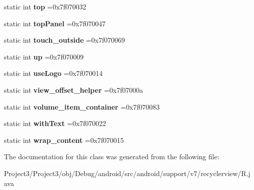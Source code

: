 \begin{DoxyCompactItemize}
static int {\bfseries top} =0x7f070032
\item 
\mbox{\label{classandroid_1_1support_1_1v7_1_1recyclerview_1_1R_1_1id_a37dfdd9a87356f548857577010e848c9}} 
static int {\bfseries top\+Panel} =0x7f070047
\item 
\mbox{\label{classandroid_1_1support_1_1v7_1_1recyclerview_1_1R_1_1id_affda487f57170dbda7543befe17f31a2}} 
static int {\bfseries touch\+\_\+outside} =0x7f070069
\item 
\mbox{\label{classandroid_1_1support_1_1v7_1_1recyclerview_1_1R_1_1id_a6732d9f390f25f1316f2f2fbb5637072}} 
static int {\bfseries up} =0x7f070009
\item 
\mbox{\label{classandroid_1_1support_1_1v7_1_1recyclerview_1_1R_1_1id_a13a41451a8af1c2640f4c9401ce81f92}} 
static int {\bfseries use\+Logo} =0x7f070014
\item 
\mbox{\label{classandroid_1_1support_1_1v7_1_1recyclerview_1_1R_1_1id_a65407f7a03aaf57279670a0ace7b6070}} 
static int {\bfseries view\+\_\+offset\+\_\+helper} =0x7f07000a
\item 
\mbox{\label{classandroid_1_1support_1_1v7_1_1recyclerview_1_1R_1_1id_ab98950715e72c2904e9f50cab99f8ce2}} 
static int {\bfseries volume\+\_\+item\+\_\+container} =0x7f070083
\item 
\mbox{\label{classandroid_1_1support_1_1v7_1_1recyclerview_1_1R_1_1id_a7200356764fe4ab18fd1ef82a55dfa55}} 
static int {\bfseries with\+Text} =0x7f070022
\item 
\mbox{\label{classandroid_1_1support_1_1v7_1_1recyclerview_1_1R_1_1id_a2a75740329c108970870ab9d8f5a8a05}} 
static int {\bfseries wrap\+\_\+content} =0x7f070015
\end{DoxyCompactItemize}


The documentation for this class was generated from the following file\+:\begin{DoxyCompactItemize}
\item 
Project3/\+Project3/obj/\+Debug/android/src/android/support/v7/recyclerview/R.\+java\end{DoxyCompactItemize}
